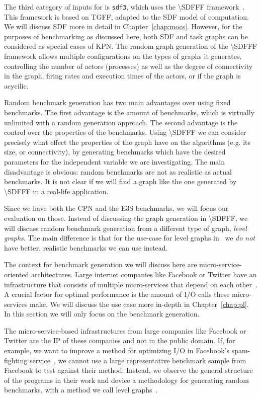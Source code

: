 The third category of inputs for \mocasin is \texttt{sdf3}, which uses the \ac{\SDFFF} framework~\cite{sdf3}.
This framework is based on \ac{TGFF}, adapted to the \ac{SDF} model of computation.
We will discuss \ac{SDF} more in detail in Chapter~\ref{chap:mocs}.
However, for the purposes of benchmarking as discussed here, both \ac{SDF} and task graphs can be considered as special cases of \ac{KPN}.
The random graph generation of the \ac{\SDFFF} framework allows multiple configurations on the types of graphs it generates, controlling the number of actors (processes) as well as the degree of connectivity in the graph, firing rates and execution times of the actors, or if the graph is acycilic.

Random benchmark generation has two main advantages over using fixed benchmarks. The first advantage is the amount of benchmarks, which is virtually unlimited with a random generation approach.
The second advantage is the control over the properties of the benchmarks.
Using \ac{\SDFFF} we can consider precisely what effect the properties of the graph have on the algorithms (e.g. its size, or connectivity), by generating benchmarks which have the desired parameters for the independent variable we are investigating.
The main disadvantage is obvious: random benchmarks are not as realistic as actual benchmarks.
It is not clear if we will find a graph like the one generated by \ac{\SDFFF} in a real-life application.

Since we have both the \ac{CPN} and the \ac{E3S} benchmarks, we will focus our evaluation on those.
Instead of discussing the graph generation in \ac{\SDFFF}, we will discuss random benchmark generation from a different type of graph, \emph{level graphs}\cite{goens_multiprog18}.
The main difference is that for the use-case for level graphs in~\cite{goens_multiprog18} we \emph{do not} have better, realistic benchmarks we can use instead.

The context for benchmark generation we will discuss here are micro-service-oriented architectures.
Large internet companies like Facebook or Twitter have an infrastructure that consists of multiple micro-services that depend on each other~\cite{marlow2014haxl}.
A crucial factor for optimal performance is the amount of \ac{I/O} calls these micro-services make.
We will discuss the use case more in-depth in Chapter~\ref{chap:pl}. 
In this section we will only focus on the benchmark generation.

The micro-service-based infrastructures from large companies like Facebook or Twitter are the \acf{IP} of these companies and not in the public domain.
If, for example, we want to improve a method for optimizing \ac{I/O} in Facebook's spam-fighting service~\cite{marlow2014haxl}, we cannot use a large representative benchmark sample from Facebook to test against their method.
Instead, we observe the general structure of the programs in their work and device a methodology for generating random benchmarks, with a method we call level graphs~\cite{goens_multiprog18}.

